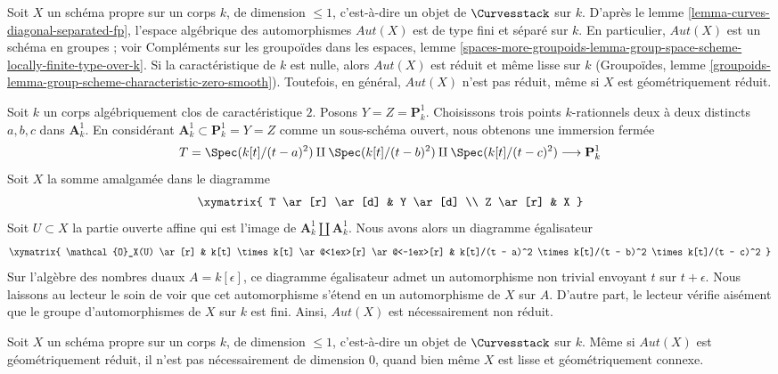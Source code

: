 \noindent
Soit $X$ un schéma propre sur un corps $k$, de dimension $\leq 1$,
c'est-à-dire un objet de $\Curvesstack$ sur $k$.
D'après le lemme \ref{lemma-curves-diagonal-separated-fp},
l'espace algébrique des automorphismes $\mathit{Aut}(X)$
est de type fini et séparé sur $k$.
En particulier, $\mathit{Aut}(X)$ est un schéma en groupes ; voir
Compléments sur les groupoïdes dans les espaces, lemme
\ref{spaces-more-groupoids-lemma-group-space-scheme-locally-finite-type-over-k}.
Si la caractéristique de $k$ est nulle, alors $\mathit{Aut}(X)$
est réduit et même lisse sur $k$ (Groupoïdes, lemme
\ref{groupoids-lemma-group-scheme-characteristic-zero-smooth}).
Toutefois, en général, $\mathit{Aut}(X)$ n'est pas réduit, même
si $X$ est géométriquement réduit.

\begin{example}
\label{example-non-reduced}
Soit $k$ un corps algébriquement clos de caractéristique $2$.
Posons $Y = Z = \mathbf{P}^1_k$. Choisissons trois points $k$-rationnels
deux à deux distincts $a, b, c$ dans $\mathbf{A}^1_k$. En considérant
$\mathbf{A}^1_k \subset \mathbf{P}^1_k = Y = Z$ comme un sous-schéma ouvert,
nous obtenons une immersion fermée
$$
T =  \Spec(k[t]/(t - a)^2) \amalg \Spec(k[t]/(t - b)^2)
\amalg \Spec(k[t]/(t - c)^2)
\longrightarrow
\mathbf{P}^1_k
$$
Soit $X$ la somme amalgamée dans le diagramme
$$
\xymatrix{
T \ar[r] \ar[d] & Y \ar[d] \\
Z \ar[r] & X
}
$$
Soit $U \subset X$ la partie ouverte affine qui est l'image de
$\mathbf{A}^1_k \amalg \mathbf{A}^1_k$. Nous avons alors un diagramme
égalisateur
$$
\xymatrix{
\mathcal{O}_X(U) \ar[r] &
k[t] \times k[t] \ar@<1ex>[r] \ar@<-1ex>[r] &
k[t]/(t - a)^2 \times k[t]/(t - b)^2 \times k[t]/(t - c)^2
}
$$
Sur l'algèbre des nombres duaux $A = k[\epsilon]$, ce diagramme égalisateur
admet un automorphisme non trivial envoyant $t$ sur $t + \epsilon$. Nous
laissons au lecteur le soin de voir que cet automorphisme s'étend en un
automorphisme de $X$ sur $A$. D'autre part, le lecteur vérifie aisément que
le groupe d'automorphismes de $X$ sur $k$ est fini.
Ainsi, $\mathit{Aut}(X)$ est nécessairement non réduit.
\end{example}

\noindent
Soit $X$ un schéma propre sur un corps $k$, de dimension $\leq 1$,
c'est-à-dire un objet de $\Curvesstack$ sur $k$. Même si $\mathit{Aut}(X)$
est géométriquement réduit, il n'est pas nécessairement de
dimension $0$, quand bien même $X$ est lisse et géométriquement connexe.

